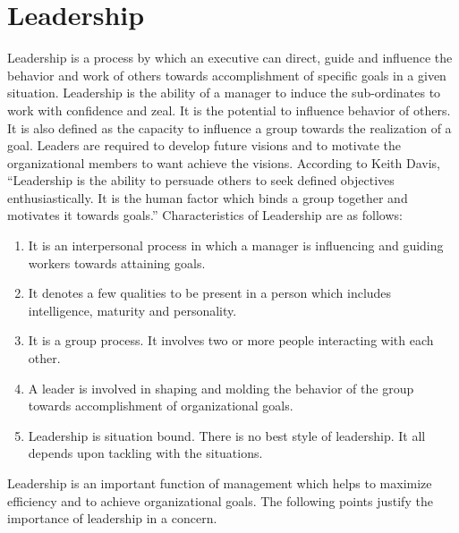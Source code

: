\section{Leadership}
Leadership is a process by which an executive can direct, guide and influence the behavior and work of others
towards accomplishment of specific goals in a given situation. Leadership is the ability of a manager to induce
the sub-ordinates to work with confidence and zeal. It is the potential to influence behavior of others. It is also
defined as the capacity to influence a group towards the realization of a goal. Leaders are required to develop
future visions and to motivate the organizational members to want achieve the visions.
According to Keith Davis, “Leadership is the ability to persuade others to seek defined objectives
enthusiastically. It is the human factor which binds a group together and motivates it towards goals.”
Characteristics of Leadership are as follows:
\begin{enumerate}
\item It is an interpersonal process in which a manager is influencing and guiding workers towards attaining
goals.
\item It denotes a few qualities to be present in a person which includes intelligence, maturity and
personality.
\item It is a group process. It involves two or more people interacting with each other.
\item A leader is involved in shaping and molding the behavior of the group towards accomplishment of
organizational goals.
\item Leadership is situation bound. There is no best style of leadership. It all depends upon tackling with
the situations.
\end{enumerate}
Leadership is an important function of management which helps to maximize efficiency and to achieve
organizational goals. The following points justify the importance of leadership in a concern.


